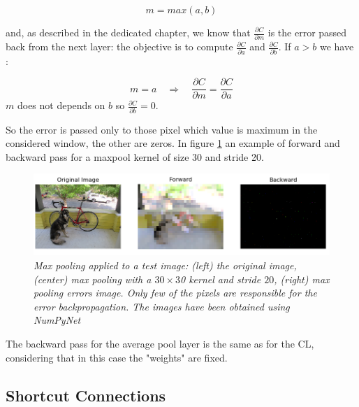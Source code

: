 \documentclass[12pt,a4paper]{report}
\begin{document}
\begin{equation}
 m = max(a, b)
\end{equation}

and, as described in the dedicated chapter, we know that $\frac{\partial C}{\partial m}$ is the error passed back from the next layer: the objective is to compute $\frac{\partial C}{\partial a}$ and $\frac{\partial C}{\partial b}$. 
If $a > b$ we have : 

\begin{equation}
 m = a \quad \Rightarrow \quad \frac{\partial C}{\partial m} = \frac{\partial C}{\partial a}
\end{equation}
$m$ does not depends on $b$ so $\frac{\partial C}{\partial b} = 0$.

So the error is passed only to those pixel which value is maximum in the considered window, the other are zeros. 
In figure \ref{fig:maxpool:ex} an example of forward and backward pass for a maxpool kernel of size 30 and stride 20.

\begin{figure}[h]
 \centering
 \includegraphics[scale=0.53]{./images/maxpool_30_20.png}
 \caption{\it Max pooling applied to a test image: (left) the original image, (center) max pooling with a $30 \times 3$0 kernel and stride $20$, (right) max pooling errors image. Only few of the pixels are responsible for the error backpropagation. 
 The images have been obtained using NumPyNet}
 \label{fig:maxpool:ex}
\end{figure}

The backward pass for the average pool layer is the same as for the CL, considering that in this case the "weights" are fixed.


\subsection*{Shortcut Connections}
\end{document}
